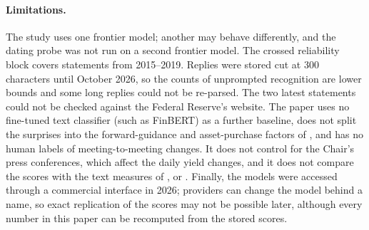 \paragraph{Limitations.} The study uses one frontier model; another may behave differently, and the
dating probe was not run on a second frontier model. The crossed
reliability block covers  statements from 2015--2019. Replies were stored cut at 300
characters until October 2026, so the counts of unprompted recognition are lower bounds and some long
replies could not be re-parsed. The two latest statements could not be checked against the Federal
Reserve's website. The paper uses no fine-tuned text classifier (such as FinBERT) as a further baseline,
does not split the surprises into the forward-guidance and asset-purchase factors of
\citet{swanson2021}, and has no human labels of meeting-to-meeting changes. It does not control for the Chair's press
conferences, which affect the daily yield changes, and it does not compare the scores with the text
measures of \citet{lucca2009}, \citet{hansen2016} or \citet{gardner2022}. Finally, the models were
accessed through a commercial interface in 2026; providers can change the model
behind a name, so exact replication of the scores may not be possible later, although every number in
this paper can be recomputed from the stored scores.
